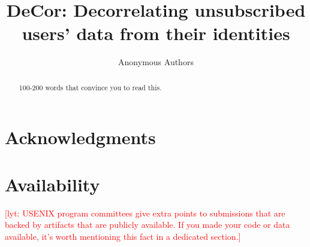 \documentclass[letterpaper,twocolumn,10pt]{article}
\newcommand{\sys}{DeCor}
\newcommand\lyt[1]{\textcolor{red}{[lyt: {#1}]}}
\begin{document}

\date{}

\title{\Large \bf \sys: Decorrelating unsubscribed users' data from their identities}


\author{
{\rm Anonymous Authors}\\
} %

\maketitle

\begin{abstract}
100-200 words that convince you to read this.
\end{abstract}








\section*{Acknowledgments}

\section*{Availability}

\lyt{USENIX program committees give extra points to submissions that are
backed by artifacts that are publicly available. If you made your code
or data available, it's worth mentioning this fact in a dedicated
section.}




\end{document}
